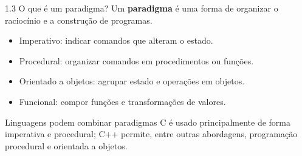 \begin{frame}[t]{1.3 O que é um paradigma?}
Um \textbf{paradigma} é uma forma de organizar o raciocínio e a construção de programas.
\begin{itemize}
\item Imperativo: indicar comandos que alteram o estado.
\item Procedural: organizar comandos em procedimentos ou funções.
\item Orientado a objetos: agrupar estado e operações em objetos.
\item Funcional: compor funções e transformações de valores.
\end{itemize}
\begin{block}{Linguagens podem combinar paradigmas}
C é usado principalmente de forma imperativa e procedural; C++ permite, entre outras abordagens, programação procedural e orientada a objetos.
\end{block}
\end{frame}

